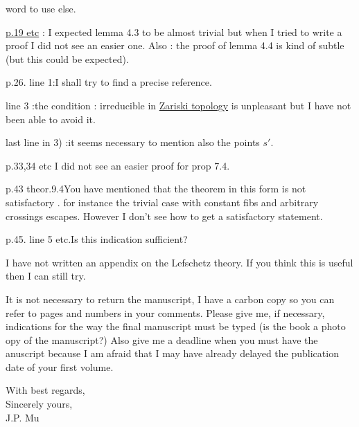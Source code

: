 word to use else.

\reversemarginpar
\margin{!}\uline{p.19 etc} : I expected lemma 4.3 to be almost trivial but when I tried to write a proof I did not see an easier one. Also : the proof of lemma 4.4 is kind of subtle (but this could be expected).

p.26. line 1:\quad I shall try to find a precise reference.

line 3 :\quad the condition : irreducible in \uline{Zariski topology} is unpleasant but I have not been able to avoid it.

last line in 3) :\quad it seems necessary to mention also the points $s'$.

p.33,34 etc \quad I did not see an easier proof for prop 7.4.

p.43 theor.9.4\quad You have mentioned that the theorem in this form is not satisfactory . for instance the trivial case with constant fibs and arbitrary crossings escapes. However I don't see how to get a satisfactory statement.

p.45. line 5 etc.\quad Is this indication sufficient?

I have not written an appendix on the Lefschetz theory. If you think this is useful then I can still try.
\normalmarginpar

It is not necessary to return the manuscript, I have a carbon copy so you can refer to pages and numbers in your comments. Please give me, if necessary, indications for the way the final manuscript must be typed (is the book a  photo opy of the manuscript?) Also give me a deadline when you must have the anuscript because I am afraid that I may have already delayed the publication date of your first volume.

With best regards,\\
Sincerely yours,\\
J.P. Mu\\

